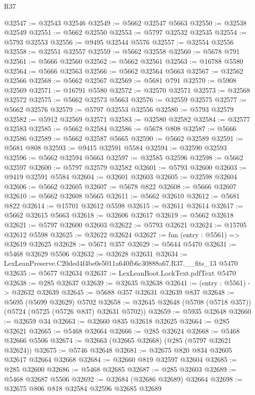 \begin{lexlean}{R37}
\begin{coremodule}
@32547 := @32543 @32546
@32549 := @5662 @32547 @5663
@32550 := @32538 @32549
@32551 := @5662 @32550
@32553 := @5797 @32532 @32535
@32554 := @5793 @32553
@32556 := @9495 @32544 @5576
@32557 := @32554 @32556
@32558 := @32551 @32557
@32559 := @5662 @32558
@32560 := @5678 @791
@32561 := @5666 @32560
@32562 := @5662 @32561
@32563 := @16788 @5580
@32564 := @5666 @32563
@32566 := @5662 @32564 @5663
@32567 := @32562 @32566
@32568 := @5662 @32567
@32569 := @5681 @791
@32570 := @5908 @32569
@32571 := @16791 @5580
@32572 := @32570 @32571
@32573 := @32568 @32572
@32575 := @5662 @32573 @5663
@32576 := @32559 @32575
@32577 := @5662 @32576
@32579 := @5797 @32553 @32556
@32580 := @5793 @32579
@32582 := @5912 @32569 @32571
@32583 := @32580 @32582
@32584 := @32577 @32583
@32585 := @5662 @32584
@32586 := @5678 @808
@32587 := @5666 @32586
@32589 := @5662 @32587 @5665
@32590 := @5662 @32589
@32591 := @5681 @808
@32593 := @9415 @32591 @5584
@32594 := @32590 @32593
@32596 := @5662 @32594 @5663
@32597 := @32585 @32596
@32598 := @5662 @32597
@32600 := @5797 @32579 @32582
@32601 := @5793 @32600
@32603 := @9419 @32591 @5584
@32604 := @32601 @32603
@32605 := @32598 @32604
@32606 := @5662 @32605
@32607 := @5678 @822
@32608 := @5666 @32607
@32610 := @5662 @32608 @5665
@32611 := @5662 @32610
@32612 := @5681 @822
@32614 := @15701 @32612 @5598
@32615 := @32611 @32614
@32617 := @5662 @32615 @5663
@32618 := @32606 @32617
@32619 := @5662 @32618
@32621 := @5797 @32600 @32603
@32622 := @5793 @32621
@32624 := @15705 @32612 @5598
@32625 := @32622 @32624
@32627 := fun (entry : @5561) => @32619 @32625
@32628 := @5671 @357
@32629 := @5644 @5470
@32631 := @5468 @32629 @5506
@32632 := @32628 @32631
@32634 := LexLeanPreserve.C20ded4f4be0e5011a640fb6c30888a67.R37.__fits_13 @5470
@32635 := @5677 @32634
@32637 := LexLeanBoot.LockText.pdfText @5470
@32638 := @285 @32637
@32639 := @32635 @32638
@32641 := (entry : @5561) -> @32632 @32639
@32645 := @5688 @357 @32631 @32639 @837
@32648 := @5695 (@5699 @32629) @5702
@32658 := @32645 @32648 (@5708 (@5718 @357)) (@5724 (@5725 (@5726 @837) @32631 @5702))
@32659 := @5935 @32648
@32660 := @32659 @34
@32663 := @32660 @835 @32618 @32625
@32664 := @285 @32621
@32665 := @5468 @32664
@32666 := @285 @32624
@32668 := @5468 @32666 @5506
@32674 := @32663 (@32665 @32668) (@285 (@5797 @32621 @32624))
@32675 := @5746 @32648
@32681 := @32675 @820 @834 @32605 @32617 @32664 @32668
@32684 := @32660 @819 @32597 @32604
@32685 := @285 @32600
@32686 := @5468 @32685
@32687 := @285 @32603
@32689 := @5468 @32687 @5506
@32692 := @32684 (@32686 @32689) @32664
@32698 := @32675 @806 @818 @32584 @32596 @32685 @32689

\end{coremodule}
\end{lexlean}

